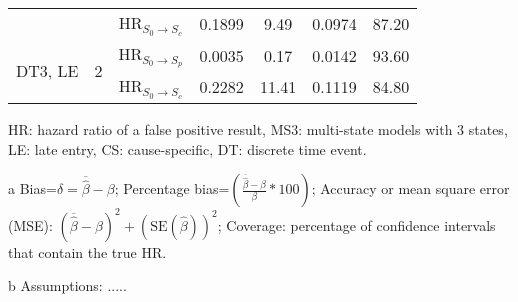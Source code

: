 \documentclass{bmcart}
\begin{document}
\begin{backmatter}
\begin{table}[!ht]
\begin{threeparttable}
\begin{tabular}{l|c|c|c|c|c|c}
      && HR$_{S_0 \rightarrow S_c}$ &0.1899	&9.49	&0.0974	&87.20\\
      \cmidrule{1-7}
      \multirow{2}{*}{\parbox{0.2\textwidth}{DT3, LE}} & \multirow{2}{*}{2} & HR$_{S_0 \rightarrow S_p}$ &0.0035&	0.17	&0.0142&	93.60\\
      && HR$_{S_0 \rightarrow S_c}$ &0.2282&	11.41&	0.1119&	84.80\\
      \bottomrule
    \end{tabular}
    \begin{tablenotes}\scriptsize
      \item HR: hazard ratio of a false positive result, MS3: multi-state models with 3 states, LE: late entry, CS: cause-specific, DT: discrete time event.
      \item[a] Bias=$\delta=\overline{\hat\beta}-\beta$; Percentage bias=$\left(\frac{\overline{\hat\beta}-\beta}{\beta}*100 \right)$; Accuracy or mean square error (MSE): $(\overline{\hat\beta}-\beta)^2+(\mbox{SE}(\hat \beta))^2$; Coverage: percentage of confidence intervals that contain the true HR.
      \item[b] Assumptions: .....
    \end{tablenotes}
  \end{threeparttable}
  \label{tab:HRFP_observed3}
\end{table}


\end{backmatter}
\end{document}
